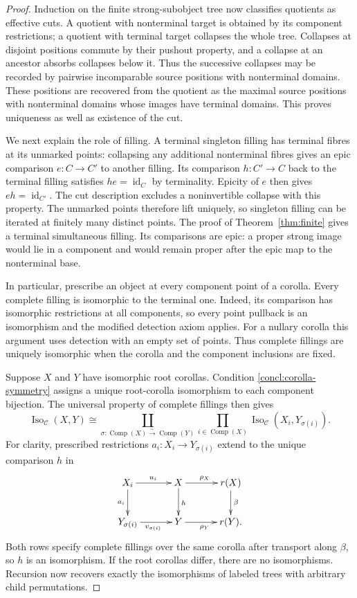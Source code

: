 \documentclass[11pt,a4paper]{article}
\theoremstyle{plain}
\theoremstyle{definition}
\theoremstyle{remark}
\newcommand{\C}{\mathcal C}
\newcommand{\id}{\operatorname{id}}
\newcommand{\Comp}{\operatorname{Comp}}
\begin{document}
\begin{proof}
Induction on the finite strong-subobject tree now classifies
quotients as effective cuts. A quotient with nonterminal target
is obtained by its component restrictions; a quotient with
terminal target collapses the whole tree. Collapses at disjoint
positions commute by their pushout property, and a collapse at
an ancestor absorbs collapses below it. Thus the successive
collapses may be recorded by pairwise incomparable source
positions with nonterminal domains. These positions are
recovered from the quotient as the maximal source positions
with nonterminal domains whose images have terminal domains.
This proves uniqueness as well as existence of the cut.

We next explain the role of filling. A terminal singleton filling
has terminal fibres at its unmarked points: collapsing any additional
nonterminal fibres gives an epic comparison $e:C\to C'$ to
another filling. Its comparison $h:C'\to C$ back to the
terminal filling satisfies $he=\id_C$ by terminality.
Epicity of $e$ then gives $eh=\id_{C'}$. The cut description
excludes a noninvertible collapse with this property. The unmarked
points therefore lift uniquely, so singleton filling can be iterated
at finitely many distinct points. The proof of
Theorem~\ref{thm:finite} gives a terminal simultaneous filling.
Its comparisons are epic: a proper strong image would lie in a
component and would remain proper after the epic map to the
nonterminal base.

In particular, prescribe an object at every component point of a
corolla. Every complete filling is isomorphic to the terminal one.
Indeed, its comparison has isomorphic restrictions at all components,
so every point pullback is an isomorphism and the modified detection
axiom applies. For a nullary corolla this argument uses detection
with an empty set of points. Thus complete fillings are uniquely
isomorphic when the corolla and the component inclusions are fixed.

Suppose $X$ and $Y$ have isomorphic root corollas. Condition
\eqref{concl:corolla-symmetry} assigns a unique root-corolla
isomorphism to each component bijection. The universal property of
complete fillings then gives
\begin{equation}\label{concl:recursive-isomorphisms}
 \operatorname{Iso}_{\C}(X,Y)\cong
 \coprod_{\sigma:\Comp(X)\xrightarrow{\sim}\Comp(Y)}
 \prod_{i\in\Comp(X)}\operatorname{Iso}_{\C}(X_i,Y_{\sigma(i)}).
\end{equation}
For clarity, prescribed restrictions $a_i:X_i\to Y_{\sigma(i)}$
extend to the unique comparison $h$ in
\[
\xymatrix@C=3.2em@R=2.4em{
X_i\ar[r]^{u_i}\ar[d]_{a_i}&X\ar[r]^{\rho_X}\ar[d]^h
 &r(X)\ar[d]^\beta\\
Y_{\sigma(i)}\ar[r]_{v_{\sigma(i)}}&Y\ar[r]_{\rho_Y}&r(Y).
}
\]
Both rows specify complete fillings over the same corolla after
transport along $\beta$, so $h$ is an isomorphism. If the root
corollas differ, there are no isomorphisms. Recursion now recovers
exactly the isomorphisms of labeled trees with arbitrary child
permutations.


\end{proof}
\end{document}

